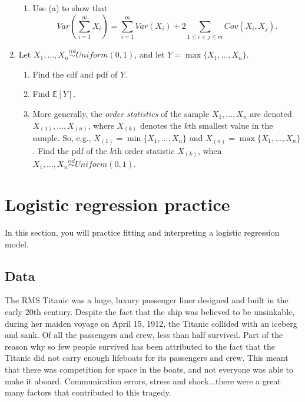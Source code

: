 \documentclass[11pt]{article}
\begin{document}
\begin{enumerate}
\begin{enumerate}
\item Use (a) to show that
$$Var\left(\sum \limits_{i=1}^m X_i\right) = \sum \limits_{i=1}^m Var(X_i) + 2 \sum \limits_{1 \leq i < j \leq m} Cov(X_i, X_j).$$
\end{enumerate}

\item Let $X_1,...,X_n \overset{iid}{\sim} Uniform(0, 1)$, and let $Y = \max \{X_1,...,X_n\}$. 

\begin{enumerate}
\item Find the cdf and pdf of $Y$.

\item Find $\mathbb{E}[Y]$.

\item More generally, the \textit{order statistics} of the sample $X_1,...,X_n$ are denoted $X_{(1)},...,X_{(n)}$, where $X_{(k)}$ denotes the $k$th smallest value in the sample. So, e.g., $X_{(1)} = \min \{X_1,...,X_n\}$ and $X_{(n)} = \max\{X_1,...,X_n\}$. Find the pdf of the $k$th order statistic $X_{(k)}$, when $X_1,...,X_n \overset{iid}{\sim} Uniform(0, 1)$.
\end{enumerate}

\end{enumerate}

\section{Logistic regression practice}

In this section, you will practice fitting and interpreting a logistic regression model.

\subsection*{Data}

The RMS Titanic was a huge, luxury passenger liner designed and built in the early 20th century. Despite the fact that the ship was believed to be unsinkable, during her maiden voyage on April 15, 1912, the Titanic collided with an iceberg and sank. Of all the passengers and crew, less than half survived. Part of the reason why so few people survived has been attributed to the fact that the Titanic did not carry enough lifeboats for its passengers and crew. This meant that there was competition for space in the boats, and not everyone was able to make it aboard. Communication errors, stress and shock...there were a great many factors that contributed to this tragedy.\\
\end{document}

